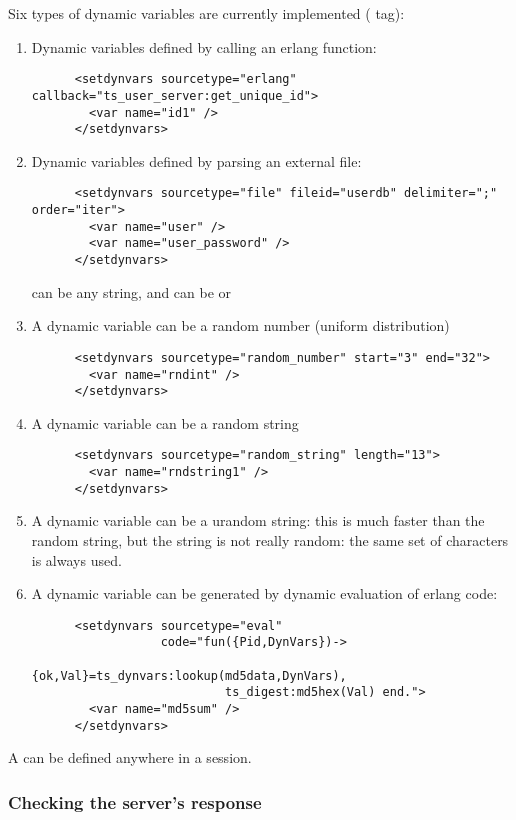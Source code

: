 \documentclass{TSUNG-en}
\begin{document}
Six types of dynamic variables are currently implemented ( tag):
\begin{enumerate}
\item Dynamic variables defined by calling an erlang function:
\begin{Verbatim}
      <setdynvars sourcetype="erlang" callback="ts_user_server:get_unique_id">
        <var name="id1" />
      </setdynvars>
\end{Verbatim}
\item Dynamic variables defined by parsing an external file:
\begin{Verbatim}
      <setdynvars sourcetype="file" fileid="userdb" delimiter=";" order="iter">
        <var name="user" />
        <var name="user_password" />
      </setdynvars>
\end{Verbatim}
 can be any string, and  can be
 or 
\item A dynamic variable can be a random number (uniform distribution)
\begin{Verbatim}
      <setdynvars sourcetype="random_number" start="3" end="32">
        <var name="rndint" />
      </setdynvars>
\end{Verbatim}
\item A dynamic variable can be a random string
\begin{Verbatim}
      <setdynvars sourcetype="random_string" length="13">
        <var name="rndstring1" />
      </setdynvars>
\end{Verbatim}
\item A dynamic variable can be a urandom string: this is much faster than
  the random string, but the string is not really random: the same set
  of characters is always used.
\item A dynamic variable can be generated by dynamic evaluation of
  erlang code:
\begin{Verbatim}
      <setdynvars sourcetype="eval"
                  code="fun({Pid,DynVars})->
                           {ok,Val}=ts_dynvars:lookup(md5data,DynVars),
                           ts_digest:md5hex(Val) end.">
        <var name="md5sum" />
      </setdynvars>
\end{Verbatim}

\end{enumerate}

A  can be defined anywhere in a session.

\subsubsection{Checking the server's response}
\end{document}
